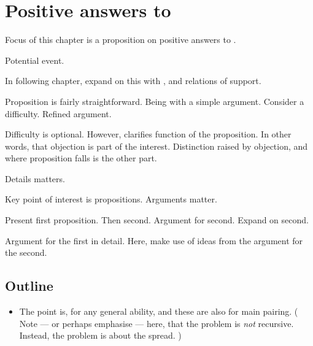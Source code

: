 \chapter{Positive answers to \qzS{}}
\label{cha:positive-answers}

\nocite{Scriven:1962vq}
\nocite{Woodward:2021ue}
\nocite{Perry:1979vc}
\nocite{Perry:1986aa}

\begin{note}
  Focus of this chapter is a proposition on positive answers to \qzS{}.

  Potential event.

  In following chapter, expand on this with , and relations of support.
\end{note}

\begin{note}
  Proposition is fairly straightforward.
  Being with a simple argument.
  Consider a difficulty.
  Refined argument.

  Difficulty is optional.
  However, clarifies function of the proposition.
  In other words, that objection is part of the interest.
  Distinction raised by objection, and where proposition falls is the other part.
\end{note}

\begin{note}
  Details matters.

  Key point of interest is propositions.
  Arguments matter.

  Present first proposition.
  Then second.
  Argument for second.
  Expand on second.

  Argument for the first in detail.
  Here, make use of ideas from the argument for the second.
\end{note}

\section{Outline}
\label{sec:outline}

\begin{note}
  \begin{itemize}
  \item
    The point is,  for any general ability, and these are also  for main pairing.
    (%
    Note --- or perhaps emphasise --- here, that the problem is \emph{not} recursive.
    Instead, the problem is about the spread.%
    )
  \end{itemize}
\end{note}

